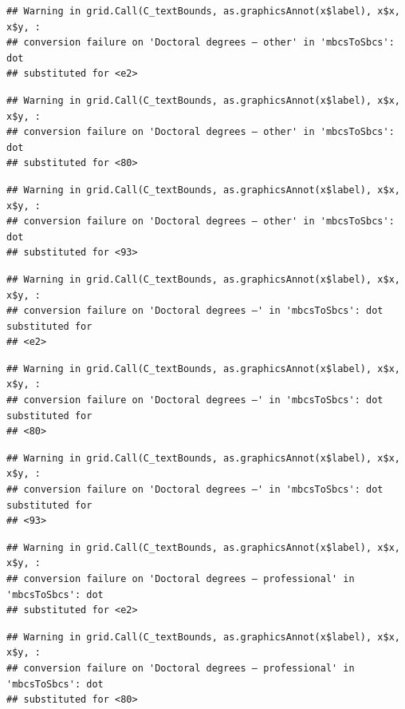 \documentclass[
]{book}
\begin{document}
\begin{verbatim}
## Warning in grid.Call(C_textBounds, as.graphicsAnnot(x$label), x$x, x$y, :
## conversion failure on 'Doctoral degrees – other' in 'mbcsToSbcs': dot
## substituted for <e2>
\end{verbatim}

\begin{verbatim}
## Warning in grid.Call(C_textBounds, as.graphicsAnnot(x$label), x$x, x$y, :
## conversion failure on 'Doctoral degrees – other' in 'mbcsToSbcs': dot
## substituted for <80>
\end{verbatim}

\begin{verbatim}
## Warning in grid.Call(C_textBounds, as.graphicsAnnot(x$label), x$x, x$y, :
## conversion failure on 'Doctoral degrees – other' in 'mbcsToSbcs': dot
## substituted for <93>
\end{verbatim}

\begin{verbatim}
## Warning in grid.Call(C_textBounds, as.graphicsAnnot(x$label), x$x, x$y, :
## conversion failure on 'Doctoral degrees –' in 'mbcsToSbcs': dot substituted for
## <e2>
\end{verbatim}

\begin{verbatim}
## Warning in grid.Call(C_textBounds, as.graphicsAnnot(x$label), x$x, x$y, :
## conversion failure on 'Doctoral degrees –' in 'mbcsToSbcs': dot substituted for
## <80>
\end{verbatim}

\begin{verbatim}
## Warning in grid.Call(C_textBounds, as.graphicsAnnot(x$label), x$x, x$y, :
## conversion failure on 'Doctoral degrees –' in 'mbcsToSbcs': dot substituted for
## <93>
\end{verbatim}

\begin{verbatim}
## Warning in grid.Call(C_textBounds, as.graphicsAnnot(x$label), x$x, x$y, :
## conversion failure on 'Doctoral degrees – professional' in 'mbcsToSbcs': dot
## substituted for <e2>
\end{verbatim}

\begin{verbatim}
## Warning in grid.Call(C_textBounds, as.graphicsAnnot(x$label), x$x, x$y, :
## conversion failure on 'Doctoral degrees – professional' in 'mbcsToSbcs': dot
## substituted for <80>
\end{verbatim}
\end{document}
